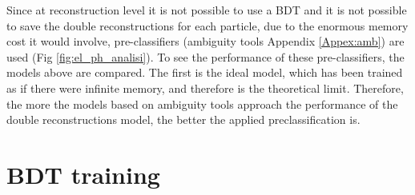 \documentclass[a4paper, oneside, 11pt, openright]{book}
\begin{document}
		Since at reconstruction level it is not possible to use a BDT and it is not possible to save the double reconstructions for each particle, due to the enormous memory cost it would involve, pre-classifiers (ambiguity tools Appendix \ref{Appex:amb}) are used (Fig \ref{fig:el_ph_analisi}). To see the performance of these pre-classifiers, the models above are compared. The first is the ideal model, which has been trained as if there were infinite memory, and therefore is the theoretical limit. Therefore, the more the models based on ambiguity tools approach the performance of the double reconstructions model, the better the applied preclassification is.
			 	
		\section{BDT training}
\end{document}
